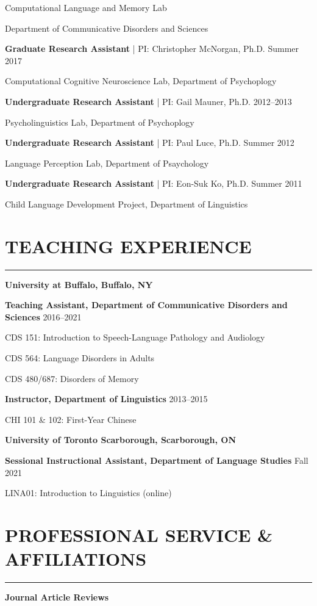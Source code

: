 \documentclass[11pt]{article}
\newcommand{\cvsection}[1]{\vspace{-0.2cm}\section*{\Large #1}\vspace{-0.2cm}\hrule\vspace{0.2cm}}
\newcommand{\h}[1]{\hspace{15pt} #1}
\begin{document}
\h{Computational Language and Memory Lab}

\h{Department of Communicative Disorders and Sciences}

\textbf{Graduate Research Assistant} | PI: Christopher McNorgan, Ph.D. \hfill Summer 2017

\h{Computational Cognitive Neuroscience Lab, Department of Psychoplogy}

\textbf{Undergraduate Research Assistant} | PI: Gail Mauner, Ph.D. \hfill 2012--2013

\h{Psycholinguistics Lab, Department of Psychoplogy}

\textbf{Undergraduate Research Assistant} | PI: Paul Luce, Ph.D. \hfill Summer 2012

\h{Language Perception Lab, Department of Psaychology}

\textbf{Undergraduate Research Assistant} | PI: Eon-Suk Ko, Ph.D. \hfill Summer 2011

\h{Child Language Development Project, Department of Linguistics}



\cvsection{TEACHING EXPERIENCE}

\textbf{\large University at Buffalo, Buffalo, NY}

\textbf{Teaching Assistant, Department of Communicative Disorders and Sciences} \hfill 2016--2021

\h{CDS 151: Introduction to Speech-Language Pathology and Audiology}

\h{CDS 564: Language Disorders in Adults}

\h{CDS 480/687: Disorders of Memory}

\textbf{Instructor, Department of Linguistics} \hfill 2013--2015

\h{CHI 101 \& 102: First-Year Chinese}

\pagebreak

\textbf{\large University of Toronto Scarborough, Scarborough, ON}

\textbf{Sessional Instructional Assistant, Department of Language Studies} \hfill Fall 2021

\h{LINA01: Introduction to Linguistics (online)}


\cvsection{PROFESSIONAL SERVICE \& AFFILIATIONS}

\textbf{Journal Article Reviews}
\end{document}
